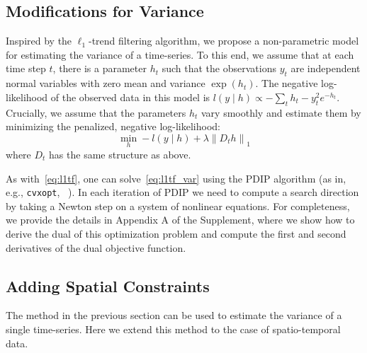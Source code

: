 \documentclass[letterpaper]{article} %
\newcommand{\citealp}[1]
{\citeauthor{#1} ~\citeyear{#1}}
\newcommand{\autoref}{\Cref}
\newcommand{\given}{\;\vert\;}
\newcommand{\norm}[1]{\left\lVert #1 \right\rVert}
\begin{document}

\subsection{Modifications for Variance}
\label{sec:l1tf_var}


Inspired by the $\ell_1$-trend filtering algorithm, we propose a
non-parametric model for estimating the variance of a time-series. To
this end, we assume that at each time step $t$, there is a parameter
$h_t$ such that the observations $y_t$
are independent normal variables with zero mean and variance
$\exp(h_t)$. The negative log-likelihood of the observed data in this
model is $l(y\given h) \propto -\sum_t h_t - y_t^2e^{-h_t}$. Crucially,
we assume that the parameters $h_t$ vary smoothly and estimate them by
minimizing the penalized, negative
log-likelihood:  
\begin{equation}
  \label{eq:l1tf_var}
  \min_h -l(y\given h)+\lambda \norm{ D_th }_1
\end{equation}
where $D_t$ has the same structure as above.

As with~\eqref{eq:l1tf}, one can solve~\eqref{eq:l1tf_var} using the
PDIP algorithm (as in, e.g.,
\texttt{cvxopt}, \citealp{andersen_cvxopt:_2013}). In each iteration of
PDIP we need to compute a search direction by taking a Newton
step on a system of nonlinear equations. For completeness, we
provide the details in Appendix A of the Supplement, where we show how to
derive the dual of this optimization problem and compute the first and
second derivatives of the dual objective function.  



\subsection{Adding Spatial Constraints}
\label{sec:exten}

The method in the previous section can be used to estimate the
variance of a single time-series. Here we extend this
method to the case of spatio-temporal data. 
\end{document}
